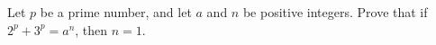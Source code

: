 Let $p$ be a prime number, and let $a$ and $n$ be positive integers. Prove that if $2^p+3^p=a^n$, then $n=1$.
